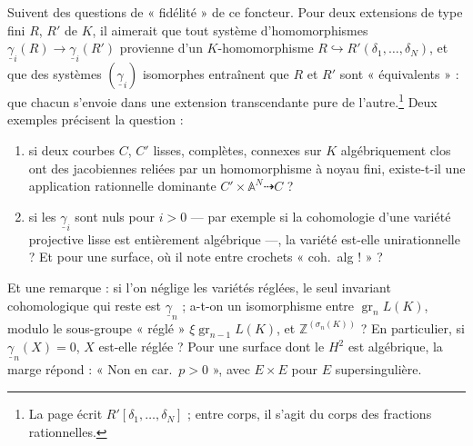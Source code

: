 \documentclass[11pt,a4paper]{article}
\begin{document}
Suivent des questions de « fidélité » de ce foncteur. Pour deux extensions de
type fini $R$, $R'$ de $K$, il aimerait que tout système d'homomorphismes
$\underline{\gamma}_{i}(R) \to \underline{\gamma}_{i}(R')$ provienne d'un
$K$-homomorphisme $R \hookrightarrow R'(\delta_{1}, \ldots, \delta_{N})$, et que
des systèmes $(\underline{\gamma}_{i})$ isomorphes entraînent que $R$ et $R'$
sont « équivalents » : que chacun s'envoie dans une extension transcendante pure
de l'autre.\footnote{La page écrit $R'[\delta_{1}, \ldots, \delta_{N}]$ ; entre
corps, il s'agit du corps des fractions rationnelles.} Deux exemples
précisent la question :
\begin{enumerate}
  \item si deux courbes $C$, $C'$ lisses, complètes, connexes sur $K$
  algébriquement clos ont des jacobiennes reliées par un homomorphisme à noyau
  fini, existe-t-il une application rationnelle dominante $C' \times
  \mathbb{A}^{N} \dashrightarrow C$ ?
  \item si les $\underline{\gamma}_{i}$ sont nuls pour $i > 0$ --- par exemple si la
  cohomologie d'une variété projective lisse est entièrement algébrique ---, la
  variété est-elle unirationnelle ? Et pour une surface, où il note entre
  crochets « coh.\ alg ! » ?
\end{enumerate}
Et une remarque : si l'on néglige les variétés réglées, le seul invariant
cohomologique qui reste est $\underline{\gamma}_{n}$ ; a-t-on un isomorphisme entre
$\operatorname{gr}_{n}L(K)$, modulo le sous-groupe « réglé » $\xi\operatorname{gr}_{n-1}
L(K)$, et $\mathbb{Z}^{(\sigma_{n}(K))}$ ? En particulier, si $\underline{\gamma}_{n}(X) = 0$,
$X$ est-elle réglée ? Pour une surface dont le $H^{2}$ est algébrique, la marge
répond : « Non en car.\ $p > 0$ », avec $E \times E$ pour $E$ supersingulière.
\end{document}
